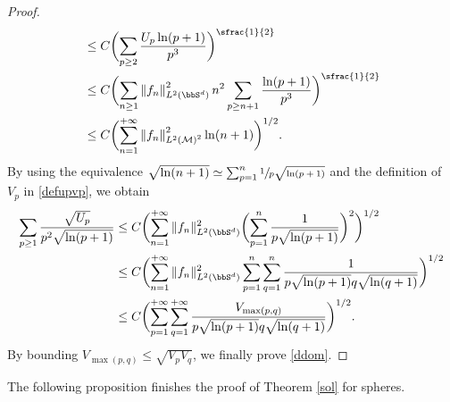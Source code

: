 \begin{proof}
\begin{align*}
& \leq C \biggl(\sum_{p\geq 2} \frac{U_p \ln(p+1)}{p^{3}} \biggr)^{\sfrac{1}{2}}\\
& \leq C\biggl(\sum_{n\geq 1} \left\Vert f_n \right\Vert_{L^2(\bbS^d)}^2 n^2 \sum_{p\geq n+1} \frac{\ln(p+1)}{p^3} \biggr)^{\sfrac{1}{2}}\\
& \leq C\biggl(\sum_{n=1}^{+\infty} \left\Vert f_n\right\Vert_{L^2(\mathcal{M)}^2 }^2\ln(n+1) \biggr)^{1/2}.
\end{align*}
By using the equivalence $\sqrt{\ln(n+1)}\simeq \sum_{p=1}^{n} \sfrac{1}{p\sqrt{\ln(p+1)}}$ and the definition of $V_p$ in \eqref{defupvp}, we obtain
\begin{align*}
\sum_{p\geq 1} \frac{\sqrt{U_p}}{p^2\sqrt{\ln(p+1)}} & \leq C\biggl(\sum_{n=1}^{+\infty} \|f_n\|_{L^2(\bbS^d)}^2 \biggl(\sum_{p=1}^n \frac{1}{p\sqrt{\ln(p+1)}} \biggr)^2 \biggr)^{1/2} \\
& \leq C\biggl(\sum_{n=1}^{+\infty} \|f_n\|_{L^2(\bbS^d)}^2 \sum_{p=1}^n \sum_{q=1}^n \frac{1}{p\sqrt{\ln(p+1)}q\sqrt{\ln(q+1)}} \biggr)^{1/2} \\
& \leq C\biggl(\sum_{p=1}^{+\infty} \sum_{q=1}^{+\infty} \frac{V_{\max(p,q)}}{p\sqrt{\ln(p+1)}q\sqrt{\ln(q+1)}} \biggr)^{1/2}.
\end{align*}
By bounding $V_{\max(p,q)}\leq \sqrt{V_p V_q}$, we finally prove \eqref{ddom}.
\end{proof}

The following proposition finishes the proof of Theorem \ref{sol} for spheres.

